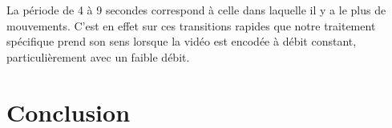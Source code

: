 \documentclass[11pt,a4paper]{article}
\begin{document}
\bigbreak
La période de 4 à 9 secondes correspond à celle dans laquelle il y a le plus de mouvements.
C'est en effet sur ces transitions rapides que notre traitement spécifique prend son sens lorsque la vidéo est encodée à débit constant, particulièrement avec un faible débit.


\section{Conclusion}
\end{document}
